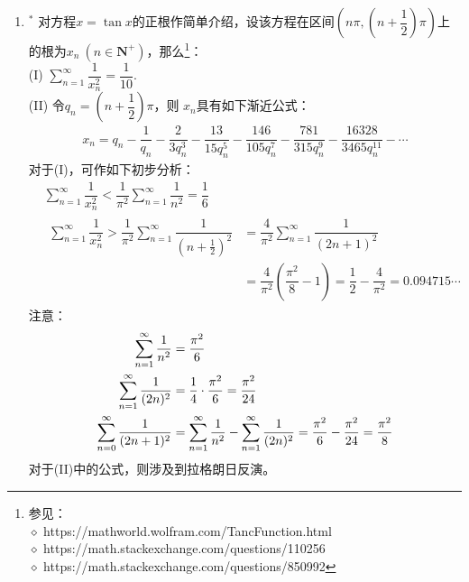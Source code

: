\begin{enumerate}[label={【\textbf{例\thechapter.\arabic*}】},
 leftmargin=\inteval{\myenumleftmargin}pt,
 itemsep=\inteval{\myenumitempsep}pt,
 itemindent=\inteval{\myenumitemindent}pt]
因为$ f\left(\dfrac{\pi}{2}\right)=0 $，所以(II)中的不等式可以变形为
\begin{gather*}
    \dfrac{-f(x)}{\frac{\pi}{2}-x}=
    \underbrace{\dfrac{f\left(\frac{\pi}{2}\right)-f(x)}{\frac{\pi}{2}-x}}
    _{\text{割线斜率}}< \underbrace{f'(x)}_{\text{切线斜率}}
    \q \left(\frac{\pi}{4}\leq x<\frac{\pi}{2}\right)
\end{gather*}
请读者结合图形思考上式的含义。

\item $^*$ 对方程$ x=\tan x $的正根作简单介绍，设该方程在区间$ \left(n\pi,
\left(n+\dfrac{1}{2}\right)\pi\right) $上的根为$ x_n\ (n\in
\textbf{N}^+) $，那么\footnote{参见：\\
    $\diamond$ https://mathworld.wolfram.com/TancFunction.html \\
    $\diamond$ https://math.stackexchange.com/questions/110256 \\
    $\diamond$ https://math.stackexchange.com/questions/850992 }：\\
(I) $ \sum\limits_{n=1}^{\infty}\dfrac{1}{x_n^2}=
\dfrac{1}{10} $. \\
(II) 令$ q_n=\left(n+\dfrac{1}{2}\right)\pi $，则
$ x_n $具有如下渐近公式：
\begin{gather*}
    x_n=q_n-\dfrac{1}{q_n}-\dfrac{2}{3q_n^3}-\dfrac{13}{15q_n^5}
    -\dfrac{146}{105q_n^7}-\dfrac{781}{315q_n^9}
    -\dfrac{16328}{3465q_n^{11}}-\cdots
\end{gather*} 
对于(I)，可作如下初步分析：
\begin{align*}
    &\sum_{n=1}^{\infty}\dfrac{1}{x_n^2}<\dfrac{1}{\pi^2}
    \sum_{n=1}^{\infty}\dfrac{1}{n^2} =\dfrac{1}{6} \\
    &\begin{aligned}
        \sum_{n=1}^{\infty}\dfrac{1}{x_n^2}> \dfrac{1}{\pi^2}
        \sum_{n=1}^{\infty}\dfrac{1}{\left(n+\frac{1}{2}\right)^2}
        &=\dfrac{4}{\pi^2}\sum_{n=1}^{\infty}\dfrac{1}{(2n+1)^2} \\
        &=\dfrac{4}{\pi^2}\left(\dfrac{\pi^2}{8}-1\right)=
        \dfrac{1}{2}-\dfrac{4}{\pi^2}=0.094715\cdots
    \end{aligned}
\end{align*}
注意：
\begin{align}
    \sum_{n=1}^{\infty}\dfrac{1}{n^2} &=\dfrac{\pi^2}{6} \notag\\
    \sum_{n=1}^{\infty}\dfrac{1}{(2n)^2} &=
    \dfrac{1}{4}\cdot\dfrac{\pi^2}{6}=\dfrac{\pi^2}{24} 
    \label{偶数平方倒数和pi^2/24}\\
    \sum_{n=0}^{\infty}\dfrac{1}{(2n+1)^2} &=
    \sum_{n=1}^{\infty}\dfrac{1}{n^2}-\sum_{n=1}^{\infty}
    \dfrac{1}{(2n)^2}=\dfrac{\pi^2}{6}-\dfrac{\pi^2}{24}
    =\dfrac{\pi^2}{8}  \label{奇数平方倒数和pi^2/8}
\end{align}
对于(II)中的公式，则涉及到拉格朗日反演。


\end{enumerate}
